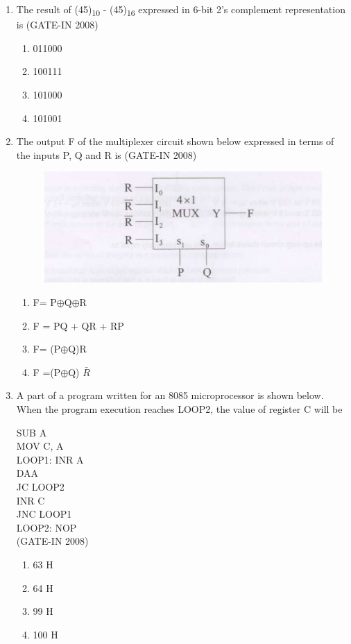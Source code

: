 \documentclass[journal,12pt,onecolumn]{IEEEtran}
\theoremstyle{remark}
\begin{document}
\begin{enumerate}[label=Q.\arabic*,start=1]
    \item The result of (45)\textsubscript{10} - (45)\textsubscript{16} expressed in 6-bit 2's complement representation is (GATE-IN 2008)
    \begin{multicols}{4}
    \begin{enumerate} 
        \item 011000
        \item 100111
        \item 101000
        \item 101001
    \end{enumerate}
    \end{multicols}
    
    \item  The output F of the multiplexer circuit shown below expressed in terms of the inputs P, Q and R is (GATE-IN 2008)
    \begin{figure}[H]
    \centering
    \includegraphics[width=0.5\columnwidth]{figs/i23.jpg}
    \caption{}
    \label{fig:placeholder23}
\end{figure}
\begin{multicols}{4}
    \begin{enumerate} 
        \item  F= P$\oplus$Q$\oplus$R
        \item  F = PQ + QR + RP
        \item  F= (P$\oplus$Q)R
        \item  F =(P$\oplus$Q) $\bar{R}$
    \end{enumerate}
    \end{multicols}
    
    \item A part of a program written for an 8085 microprocessor is shown below. When the program
execution reaches LOOP2, the value of register C will be

 SUB A\\ 
 MOV C, A  \\
 LOOP1: INR A\\  
    DAA  \\
    JC LOOP2\\  
    INR C  \\
    JNC LOOP1\\  
LOOP2: NOP\\
 (GATE-IN 2008)
 \begin{multicols}{4}
    \begin{enumerate} 
        \item 63 H
        \item 64 H
        \item 99 H
        \item 100 H
    \end{enumerate}
    \end{multicols}
    

\end{enumerate}
\end{document}
